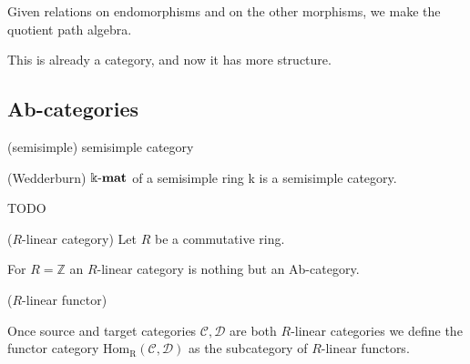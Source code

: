 Given relations on endomorphisms and on the other morphisms, we make the quotient path algebra.

This is already a category, and now it has more structure.

\subsection{Ab-categories}


\begin{definition}{(semisimple)}
semisimple category
\end{definition}

\begin{theorem}{(Wedderburn)}
$\Bbbk\textnormal{-}\mathbf{mat}$ of a semisimple ring k is a semisimple category.
\end{theorem}
TODO








\begin{definition}{($R$-linear category)}
Let $R$ be a commutative ring.
\end{definition}

For $R = \mathbb{Z}$ an $R$-linear category is nothing but an Ab-category.

\begin{definition}{($R$-linear functor)}

\end{definition}

\begin{definition}
Once source and target categories $\mathcal{C}, \mathcal{D}$ are both $R$-linear categories we define the functor category
$\mathrm{Hom_{R}}(\mathcal{C},\mathcal{D})$ as the subcategory of $R$-linear functors.
\end{definition}



